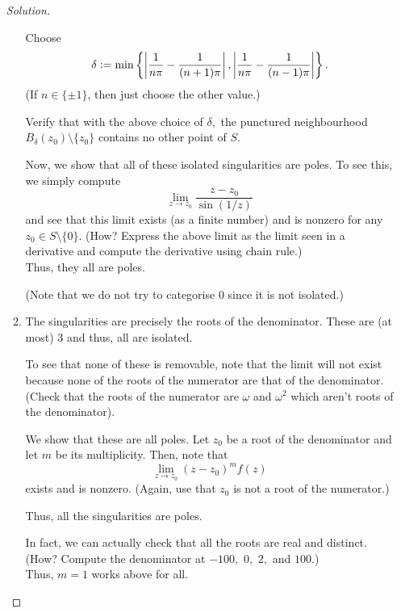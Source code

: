 \documentclass[12pt]{article}
\theoremstyle{definition}
\numberwithin{thm}{section}
\newenvironment{soln}{\begin{proof}[Solution]}{\end{proof}}
\begin{document}
\begin{enumerate}
\begin{soln}
\begin{enumerate}
			Choose 
			\begin{equation*} 
				\delta \vcentcolon= \min\left\{\left|\dfrac{1}{n\pi} - \dfrac{1}{(n + 1)\pi}\right|, \left|\dfrac{1}{n\pi} - \dfrac{1}{(n - 1)\pi}\right|\right\}.
			\end{equation*}
			(If $n \in \{\pm1\}$, then just choose the other value.)

			Verify that with the above choice of $\delta,$ the punctured neighbourhood $B_\delta(z_0)\setminus\{z_0\}$ contains no other point of $S.$

			Now, we show that all of these isolated singularities are poles. To see this, we simply compute
			\begin{equation*} 
				\lim_{z\to z_0}\dfrac{z - z_0}{\sin(1/z)}
			\end{equation*}
			and see that this limit exists (as a finite number) and is nonzero for any $z_0 \in S\setminus\{0\}.$ (How? Express the above limit as the limit seen in a derivative and compute the derivative using chain rule.) \\
			Thus, they all are poles.

			(Note that we do not try to categorise $0$ since it is not isolated.)
			\item The singularities are precisely the roots of the denominator. These are (at most) $3$ and thus, all are isolated.

			To see that none of these is removable, note that the limit will not exist because none of the roots of the numerator are that of the denominator. (Check that the roots of the numerator are $\omega$ and $\omega^2$ which aren't roots of the denominator).

			We show that these are all poles. Let $z_0$ be a root of the denominator and let $m$ be its multiplicity. Then, note that
			\begin{equation*} 
				\lim_{z\to z_0}(z - z_0)^mf(z)
			\end{equation*}
			exists and is nonzero. (Again, use that $z_0$ is not a root of the numerator.)

			Thus, all the singularities are poles.

			In fact, we can actually check that all the roots are real and distinct. (How? Compute the denominator at $-100,$ $0,$ $2,$ and $100.$) \\
			Thus, $m = 1$ works above for all. \qedhere
		\end{enumerate}
	\end{soln}
\end{enumerate}
\end{document}
